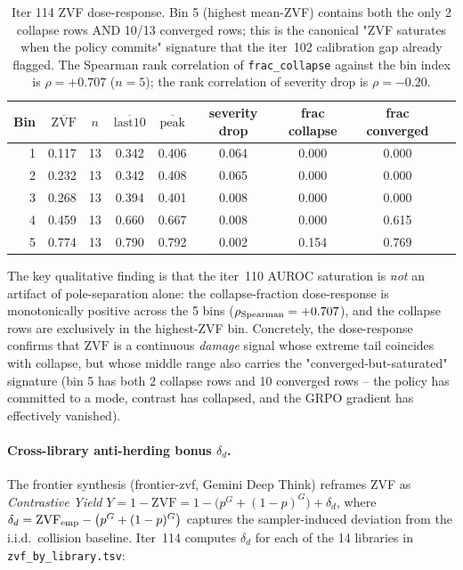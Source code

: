 \begin{table}[ht]\centering\small
\begin{tabular}{rrccccccc}
\toprule
Bin & \(\overline{\mathrm{ZVF}}\) & \(n\) & \(\overline{\mathrm{last10}}\) & \(\overline{\mathrm{peak}}\) & severity drop & frac collapse & frac converged \\
\midrule
1 & 0.117 & 13 & 0.342 & 0.406 & 0.064 & 0.000 & 0.000 \\
2 & 0.232 & 13 & 0.342 & 0.408 & 0.065 & 0.000 & 0.000 \\
3 & 0.268 & 13 & 0.394 & 0.401 & 0.008 & 0.000 & 0.000 \\
4 & 0.459 & 13 & 0.660 & 0.667 & 0.008 & 0.000 & 0.615 \\
5 & 0.774 & 13 & 0.790 & 0.792 & 0.002 & 0.154 & 0.769 \\
\bottomrule
\end{tabular}
\caption{Iter 114 ZVF dose-response. Bin 5 (highest mean-ZVF)
contains both the only 2 collapse rows AND 10/13 converged rows;
this is the canonical "ZVF saturates when the policy commits" signature
that the iter~102 calibration gap already flagged. The Spearman rank
correlation of \texttt{frac\_collapse} against the bin index is
\(\rho = +0.707\) (\(n{=}5\)); the rank correlation of severity drop
is \(\rho = -0.20\).}
\label{tab:zvf-dose}
\end{table}

\noindent The key qualitative finding is that the iter~110
AUROC saturation is \emph{not} an artifact of pole-separation alone:
the collapse-fraction dose-response is monotonically positive across
the 5 bins (\(\rho_{\rm Spearman}=+0.707\)), and the
collapse rows are exclusively in the highest-ZVF bin. Concretely,
the dose-response confirms that \(\mathrm{ZVF}\) is a continuous
\emph{damage} signal whose extreme tail coincides with collapse, but
whose middle range also carries the "converged-but-saturated"
signature (bin 5 has both 2 collapse rows and 10 converged rows --
the policy has committed to a mode, contrast has collapsed, and the
GRPO gradient has effectively vanished).

\paragraph{Cross-library anti-herding bonus \(\delta_{d}\).}
The frontier synthesis (frontier-zvf, Gemini Deep Think) reframes
ZVF as \emph{Contrastive Yield}
\(Y = 1 - \mathrm{ZVF} = 1 - \bigl(p^{G}+(1-p)^{G}\bigr) + \delta_{d}\),
where \(\delta_{d} = \mathrm{ZVF}_{\rm emp} -
\bigl(p^{G}+(1-p)^{G}\bigr)\) captures the sampler-induced
deviation from the i.i.d.\ collision baseline. Iter~114 computes
\(\delta_{d}\) for each of the 14 libraries in
\texttt{zvf\_by\_library.tsv}:

